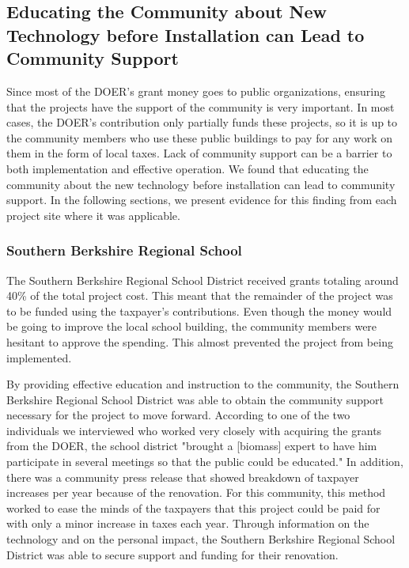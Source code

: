 \subsection{Educating the Community about New Technology before Installation can Lead to Community Support}
\par Since most of the DOER’s grant money goes to public organizations, ensuring that the projects have the support of the community is very important. In most cases, the DOER’s contribution only partially funds these projects, so it is up to the community members who use these public buildings to pay for any work on them in the form of local taxes. Lack of community support can be a barrier to both implementation and effective operation. We found that educating the community about the new technology before installation can lead to community support. In the following sections, we present evidence for this finding from each project site where it was applicable.

\subsubsection{Southern Berkshire Regional School}
\par The Southern Berkshire Regional School District received grants totaling around 40\% of the total project cost. This meant that the remainder of the project was to be funded using the taxpayer’s contributions. Even though the money would be going to improve the local school building, the community members were hesitant to approve the spending. This almost prevented the project from being implemented.
\par By providing effective education and instruction to the community, the Southern Berkshire Regional School District was able to obtain the community support necessary for the project to move forward. According to one of the two individuals we interviewed who worked very closely with acquiring the grants from the DOER, the school district "brought a [biomass] expert to have him participate in several meetings so that the public could be educated." In addition, there was a community press release that showed breakdown of taxpayer increases per year because of the renovation. For this community, this method worked to ease the minds of the taxpayers that this project could be paid for with only a minor increase in taxes each year. Through information on the technology and on the personal impact, the Southern Berkshire Regional School District was able to secure support and funding for their renovation.

